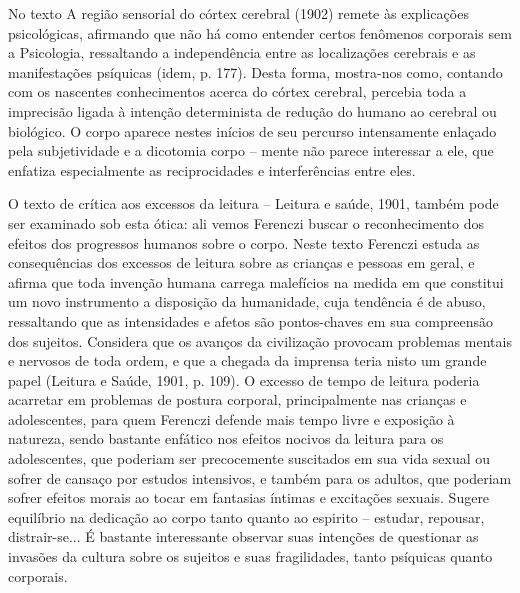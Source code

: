 No texto A região sensorial do córtex cerebral (1902) remete às
explicações psicológicas, afirmando que não há como entender certos
fenômenos corporais sem a Psicologia, ressaltando a independência entre
as localizações cerebrais e as manifestações psíquicas (idem, p. 177).
Desta forma, mostra-nos como, contando com os nascentes conhecimentos
acerca do córtex cerebral, percebia toda a imprecisão ligada à intenção
determinista de redução do humano ao cerebral ou biológico. O corpo
aparece nestes inícios de seu percurso intensamente enlaçado pela
subjetividade e a dicotomia corpo -- mente não parece interessar a ele,
que enfatiza especialmente as reciprocidades e interferências entre
eles.

O texto de crítica aos excessos da leitura -- Leitura e saúde, 1901,
também pode ser examinado sob esta ótica: ali vemos Ferenczi buscar o
reconhecimento dos efeitos dos progressos humanos sobre o corpo. Neste
texto Ferenczi estuda as consequências dos excessos de leitura sobre as
crianças e pessoas em geral, e afirma que toda invenção humana carrega
malefícios na medida em que constitui um novo instrumento a disposição
da humanidade, cuja tendência é de abuso, ressaltando que as
intensidades e afetos são pontos-chaves em sua compreensão dos sujeitos.
Considera que os avanços da civilização provocam problemas mentais e
nervosos de toda ordem, e que a chegada da imprensa teria nisto um
grande papel (Leitura e Saúde, 1901, p. 109). O excesso de tempo de
leitura poderia acarretar em problemas de postura corporal,
principalmente nas crianças e adolescentes, para quem Ferenczi defende
mais tempo livre e exposição à natureza, sendo bastante enfático nos
efeitos nocivos da leitura para os adolescentes, que poderiam ser
precocemente suscitados em sua vida sexual ou sofrer de cansaço por
estudos intensivos, e também para os adultos, que poderiam sofrer
efeitos morais ao tocar em fantasias íntimas e excitações sexuais.
Sugere equilíbrio na dedicação ao corpo tanto quanto ao espirito --
estudar, repousar, distrair-se... É bastante interessante observar suas
intenções de questionar as invasões da cultura sobre os sujeitos e suas
fragilidades, tanto psíquicas quanto corporais.

